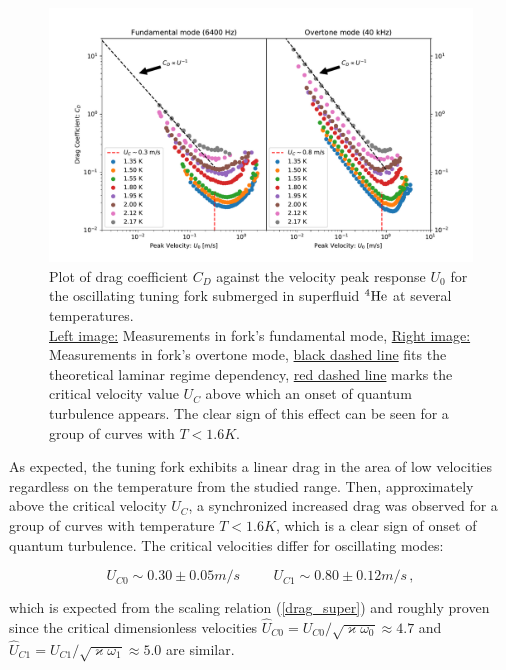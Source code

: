 \newpage

\begin{figure}[h]
	\hspace{-1.7cm}
	\includegraphics[width=1.2\textwidth]{graphics/results/fork-drag_vel}
	\caption{Plot of drag coefficient $C_D$ against the velocity peak response $U_0$ for the oscillating tuning fork submerged in superfluid ${}^4\mathrm{He}$ at several temperatures.\\
	\underline{Left image:} Measurements in fork's fundamental mode, \underline{Right image:} Measurements in fork's overtone mode, \underline{black dashed line} fits the theoretical laminar regime dependency, \underline{red dashed line} marks the critical velocity value $U_C$ above which an onset of quantum turbulence appears. The clear sign of this effect can be seen for a group of curves with $T < 1.6\unit{K}$.}
	\label{fork-drag_vel}
\end{figure}

As expected, the tuning fork exhibits a linear drag in the area of low velocities regardless on the temperature from the studied range. Then, approximately above the critical velocity $U_C$, a synchronized increased drag was observed for a group of curves with temperature $T < 1.6\unit{K}$, which is a clear sign of onset of quantum turbulence. The critical velocities differ for oscillating modes:

\begin{equation}
U_{C0} \sim 0.30 \pm 0.05 \unit {m/s}
\hspace{1cm}
U_{C1} \sim 0.80 \pm 0.12\unit {m/s}\,,
\end{equation}

which is expected from the scaling relation (\ref{drag_super}) and roughly proven since the critical dimensionless velocities $\hat{U}_{C0} = U_{C0} / \sqrt{ \varkappa \omega_0} \approx 4.7$ and $\hat{U}_{C1} = U_{C1} / \sqrt{ \varkappa \omega_1} \approx 5.0$ are similar.

